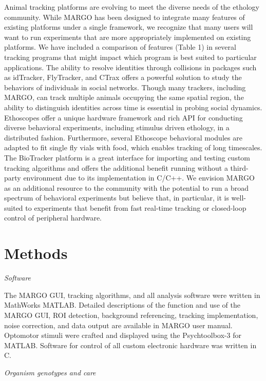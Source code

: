 \documentclass[10pt]{article}
\begin{document}
\begin{multicols}{2}
Animal tracking platforms are evolving to meet the diverse needs of the ethology community. While MARGO has been designed to integrate many features of existing platforms under a single framework, we recognize that many users will want to run experiments that are more appropriately implemented on existing platforms. We have included a comparison of features (Table 1) in several tracking programs that might impact which program is best suited to particular applications. The ability to resolve identities through collisions in packages such as idTracker, FlyTracker, and CTrax offers a powerful solution to study the behaviors of individuals in social networks. Though many trackers, including MARGO, can track multiple animals occupying the same spatial region, the ability to distinguish identities across time is essential in probing social dynamics. Ethoscopes offer a unique hardware framework and rich API for conducting diverse behavioral experiments, including stimulus driven ethology, in a distributed fashion. Furthermore, several Ethoscope behavioral modules are adapted to fit single fly vials with food, which enables tracking of long timescales. The BioTracker platform is a great interface for importing and testing custom tracking algorithms and offers the additional benefit running without a third-party environment due to its implementation in C/C++.  We envision MARGO as an additional resource to the community with the potential to run a broad spectrum of behavioral experiments but believe that, in particular, it is well-suited to experiments that benefit from fast real-time tracking or closed-loop control of peripheral hardware. 

\section*{Methods}

\noindent\textit{Software}
\vspace*{0.3cm}

The MARGO GUI, tracking algorithms, and all analysis software were written in MathWorks MATLAB. Detailed descriptions of the function and use of the MARGO GUI, ROI detection, background referencing, tracking implementation, noise correction, and data output are available in MARGO user manual. Optomotor stimuli were crafted and displayed using the Psychtoolbox-3 for MATLAB. Software for control of all custom electronic hardware was written in C.

\vspace*{0.5cm}
\noindent\textit{Organism genotypes and care}
\vspace*{0.3cm}


\end{multicols}
\end{document}
